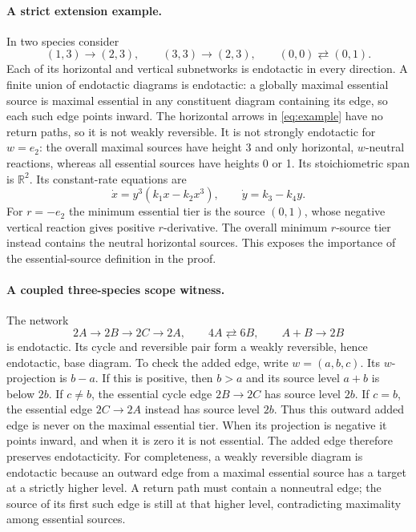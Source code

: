 \documentclass[11pt]{article}
\theoremstyle{definition}
\theoremstyle{remark}
\newcommand{\R}{\mathbb R}
\numberwithin{equation}{section}
\begin{document}
\paragraph{A strict extension example.}
In two species consider
\begin{equation}
 (1,3)\to(2,3),\qquad (3,3)\to(2,3),\qquad
 (0,0)\rightleftarrows(0,1).
 \label{eq:example}
\end{equation}
Each of its horizontal and vertical subnetworks is endotactic
in every direction. A finite union of endotactic diagrams is
endotactic: a globally maximal essential source is maximal
essential in any constituent diagram containing its edge,
so each such edge points inward. The horizontal arrows in
\eqref{eq:example} have no return paths, so it is not weakly
reversible. It is not strongly endotactic for $w=e_2$: the
overall maximal sources have height 3 and only horizontal,
$w$-neutral reactions, whereas all essential sources have
heights 0 or 1. Its stoichiometric span is $\R^2$.
Its constant-rate equations are
\[
 \dot x=y^3(k_1x-k_2x^3),\qquad \dot y=k_3-k_4y.
\]
For $r=-e_2$ the minimum essential tier is the source
$(0,1)$, whose negative vertical reaction gives positive
$r$-derivative. The overall minimum $r$-source tier instead
contains the neutral horizontal sources. This exposes the
importance of the essential-source definition in the proof.

\paragraph{A coupled three-species scope witness.}
The network
\begin{equation}
 2A\to2B\to2C\to2A,\qquad 4A\rightleftarrows6B,\qquad
 A+B\to2B
 \label{eq:3Dwitness}
\end{equation}
is endotactic. Its cycle and reversible pair form a weakly
reversible, hence endotactic, base diagram. To check the added
edge, write $w=(a,b,c)$. Its $w$-projection is $b-a$.
If this is positive, then $b>a$ and its source level $a+b$
is below $2b$. If $c\ne b$, the essential cycle edge
$2B\to2C$ has source level $2b$. If $c=b$, the essential
edge $2C\to2A$ instead has source level $2b$. Thus this
outward added edge is never on the maximal essential tier.
When its projection is negative it points inward, and when
it is zero it is not essential. The added edge therefore
preserves endotacticity. For completeness, a weakly
reversible diagram is endotactic because an outward edge
from a maximal essential source has a target at a strictly
higher level. A return path must contain a nonneutral edge;
the source of its first such edge is still at that higher
level, contradicting maximality among essential sources.
\end{document}
